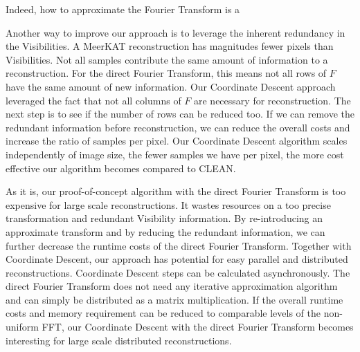 Indeed, how to approximate the Fourier Transform is a 

Another way to improve our approach is to leverage the inherent redundancy in the Visibilities. A MeerKAT reconstruction has magnitudes fewer pixels than Visibilities. Not all samples contribute the same amount of information to a reconstruction. For the direct Fourier Transform, this means not all rows of $F$ have the same amount of new information. Our Coordinate Descent approach leveraged the fact that not all columns of $F$ are necessary for reconstruction. The next step is to see if the number of rows can be reduced too. If we can remove the redundant information before reconstruction, we can reduce the overall costs and increase the ratio of samples per pixel. Our Coordinate Descent algorithm scales independently of image size, the fewer samples we have per pixel, the more cost effective our algorithm becomes compared to CLEAN.

As it is, our proof-of-concept algorithm with the direct Fourier Transform is too expensive for large scale reconstructions. It wastes resources on a too precise transformation and redundant Visibility information. By re-introducing an approximate transform and by reducing the redundant information, we can further decrease the runtime costs of the direct Fourier Transform. Together with Coordinate Descent, our approach has potential for easy parallel and distributed reconstructions. Coordinate Descent steps can be calculated asynchronously. The direct Fourier Transform does not need any iterative approximation algorithm and can simply be distributed as a matrix multiplication. If the overall runtime costs and memory requirement can be reduced to comparable levels of the non-uniform FFT, our Coordinate Descent with the direct Fourier Transform becomes interesting for large scale distributed reconstructions.


















 